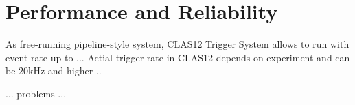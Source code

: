 \section{Performance and Reliability}

As free-running pipeline-style system, CLAS12 Trigger System allows to run with event rate up to ...
Actial trigger rate in CLAS12 depends on experiment and can be 20kHz and higher ..

... problems ...